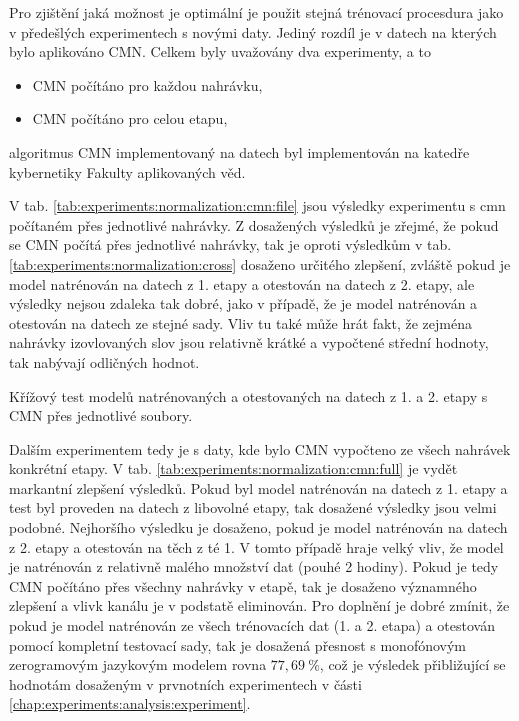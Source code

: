 Pro zjištění jaká možnost je optimální je použit stejná trénovací procesdura jako v předešlých experimentech s novými daty. Jediný rozdíl je v datech na kterých bylo aplikováno CMN. Celkem byly uvažovány dva experimenty, a to

\begin{itemize}
  \item CMN počítáno pro každou nahrávku,
  \item CMN počítáno pro celou etapu,
\end{itemize}

\noindent algoritmus CMN implementovaný na datech byl implementován na katedře kybernetiky Fakulty aplikovaných věd.

V tab. \ref{tab:experiments:normalization:cmn:file} jsou výsledky experimentu s cmn počítaném přes jednotlivé nahrávky. Z dosažených výsledků je zřejmé, že pokud se CMN počítá přes jednotlivé nahrávky, tak je oproti výsledkům v tab. \ref{tab:experiments:normalization:cross} dosaženo určitého zlepšení, zvláště pokud je model natrénován na datech z 1. etapy a otestován na datech z 2. etapy, ale výsledky nejsou zdaleka tak dobré, jako v případě, že je model natrénován a otestován na datech ze stejné sady. Vliv tu také může hrát fakt, že zejména nahrávky izovlovaných slov jsou relativně krátké a vypočtené střední hodnoty, tak nabývají odličných hodnot.

\begin{table}[htpb]
  \centering
  \def\arraystretch{1.5}
  \caption{Křížový test modelů natrénovaných a otestovaných na datech z 1. a 2. etapy s CMN přes jednotlivé soubory.}
  \label{tab:experiments:normalization:cmn:file}
\end{table}

Dalším experimentem tedy je s daty, kde bylo CMN vypočteno ze všech nahrávek konkrétní etapy. V tab. \ref{tab:experiments:normalization:cmn:full} je vydět markantní zlepšení výsledků. Pokud byl model natrénován na datech z 1. etapy a test byl proveden na datech z libovolné etapy, tak dosažené výsledky jsou velmi podobné. Nejhoršího výsledku je dosaženo, pokud je model natrénován na datech z 2. etapy a otestován na těch z té 1. V tomto případě hraje velký vliv, že model je natrénován z relativně malého množství dat (pouhé 2 hodiny). Pokud je tedy CMN počítáno přes všechny nahrávky v etapě, tak je dosaženo významného zlepšení a vlivk kanálu je v podstatě eliminován. Pro doplnění je dobré zmínit, že pokud je model natrénován ze všech trénovacích dat (1. a 2. etapa) a otestován pomocí kompletní testovací sady, tak je dosažená přesnost s monofónovým zerogramovým jazykovým modelem rovna $77,69\ \%$, což je výsledek přibližující se hodnotám dosaženým v prvnotních experimentech v části \ref{chap:experiments:analysis:experiment}.

